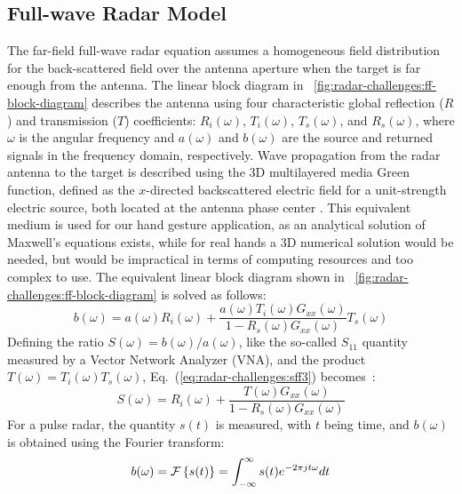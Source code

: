 \subsection{Full-wave Radar Model} \label{sec:radar-challenges:mathematical-theory:radar-model}
The far-field full-wave radar equation \cite{Lambot:2004} assumes a homogeneous field distribution for the back-scattered field over the antenna aperture when the target is far enough from the antenna. The linear block diagram in \fig~\ref{fig:radar-challenges:ff-block-diagram} describes the antenna using four characteristic global reflection ($R$) and transmission ($T$) coefficients: $R_i(\omega)$, $T_i(\omega)$, $T_s(\omega)$, and $R_s(\omega)$, where $\omega$ is the angular frequency and $a(\omega)$ and $b(\omega)$ are the source and returned signals in the frequency domain, respectively. Wave propagation from the radar antenna to the target is described using the 3D multilayered media Green function, defined as the $x$-directed backscattered electric field for a unit-strength electric source, both located at the antenna phase center \cite{Chew:1990,Michalski:1990,Slob:2002,Lambot:2004}. This equivalent medium is used for our hand gesture application, as an analytical solution of Maxwell's equations exists, while for real hands a 3D numerical solution would be needed, but would be impractical in terms of computing resources and too complex to use.
The equivalent linear block diagram shown in \fig~\ref{fig:radar-challenges:ff-block-diagram} is solved as follows:
\begin{equation}\label{eq:radar-challenges:sff3}
b(\omega) = a(\omega) R_{i}(\omega) + \frac{a(\omega) T_{i}(\omega) G_{xx}(\omega)}{1- R_{s}(\omega) G_{xx}(\omega)} T_{s}(\omega)
\end{equation}
Defining the ratio $S(\omega) = b(\omega)/a(\omega)$, like the so-called $S_{11}$ quantity measured by a Vector Network Analyzer (VNA), and the product $T(\omega) = T_{i}(\omega)T_{s}(\omega)$, Eq.~(\ref{eq:radar-challenges:sff3}) becomes~\cite{Lambot:2004}:
\begin{equation}\label{eq:radar-challenges:sff4}
S(\omega) = R_{i}(\omega) + \frac{T(\omega) G_{xx}(\omega)}{1- R_{s}(\omega) G_{xx}(\omega)}
\end{equation}
For a pulse radar, the quantity $s(t)$ is measured, with $t$ being time, and $b(\omega)$ is obtained using the Fourier transform:
\begin{equation}
\label{eq:radar-challenges:fft}
b(\omega)=\text{$\cal{F}$}\left\{
s(t)
\right\}=\int_{-\infty}^{\infty}s(t)e^{-2\pi j t \omega}dt
\end{equation}
